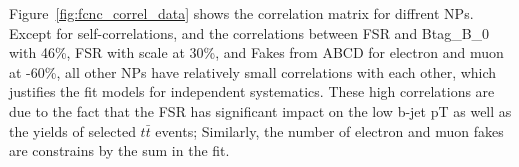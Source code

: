 

Figure~\ref{fig:fcnc_correl_data} shows the correlation matrix for diffrent NPs. Except for self-correlations, and the correlations between FSR and Btag\_B\_0 with 46\%,
FSR with scale at 30\%, and Fakes from ABCD for electron and muon at -60\%, all other NPs have relatively small correlations with each other, which justifies the fit models for independent systematics. These high correlations are due to the fact that the FSR has significant impact on the low b-jet pT as well as the yields of selected
$t\bar t$ events; Similarly, the number of electron and muon fakes are constrains by the sum in the fit.   




